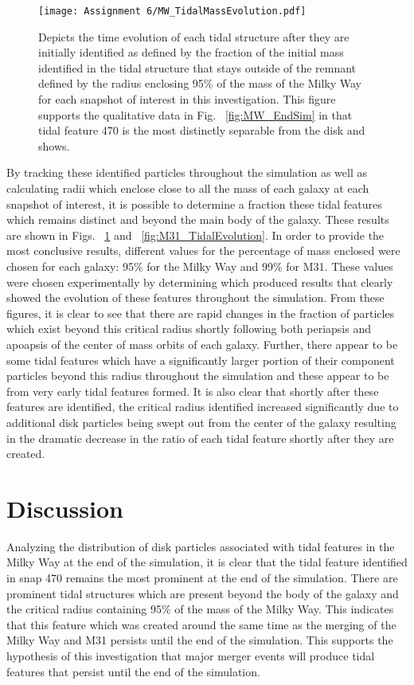 \documentclass[fleqn,usenatbib]{mnras}
\begin{document}
\begin{figure}
	\texttt{[image: Assignment 6/MW\_TidalMassEvolution.pdf]}
    \caption{Depicts the time evolution of each tidal structure after they are initially identified as defined by the fraction of the initial mass identified in the tidal structure that stays outside of the remnant defined by the radius enclosing 95\% of the mass of the Milky Way for each snapshot of interest in this investigation. This figure supports the qualitative data in Fig. ~\ref{fig:MW_EndSim} in that tidal feature 470 is the most distinctly separable from the disk and shows.}
    \label{fig:MW_TidalEvolution}
\end{figure}

By tracking these identified particles throughout the simulation as well as calculating radii which enclose close to all the mass of each galaxy at each snapshot of interest, it is possible to determine a fraction these tidal features which remains distinct and beyond the main body of the galaxy. These results are shown in Figs. ~\ref{fig:MW_TidalEvolution} and ~\ref{fig:M31_TidalEvolution}. In order to provide the most conclusive results, different values for the percentage of mass enclosed were chosen for each galaxy: 95\% for the Milky Way and 99\% for M31. These values were chosen experimentally by determining which produced results that clearly showed the evolution of these features throughout the simulation. From these figures, it is clear to see that there are rapid changes in the fraction of particles which exist beyond this critical radius shortly following both periapsis and apoapsis of the center of mass orbits of each galaxy. Further, there appear to be some tidal features which have a significantly larger portion of their component particles beyond this radius throughout the simulation and these appear to be from very early tidal features formed. It is also clear that shortly after these features are identified, the critical radius identified increased significantly due to additional disk particles being swept out from the center of the galaxy resulting in the dramatic decrease in the ratio of each tidal feature shortly after they are created.

\section{Discussion}
Analyzing the distribution of disk particles associated with tidal features in the Milky Way at the end of the simulation, it is clear that the tidal feature identified in snap 470 remains the most prominent at the end of the simulation. There are prominent tidal structures which are present beyond the body of the galaxy and the critical radius containing 95\% of the mass of the Milky Way. This indicates that this feature which was created around the same time as the merging of the Milky Way and M31 persists until the end of the simulation. This supports the hypothesis of this investigation that major merger events will produce tidal features that persist until the end of the simulation. 
\end{document}
